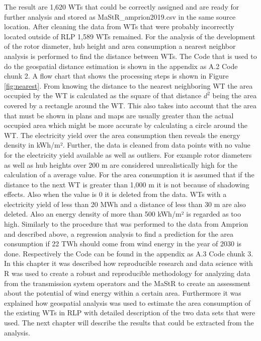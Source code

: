 \documentclass[a4paper,11pt]{article}
\begin{document}
The result are 1,620 WTs that could be correctly assigned and are ready for further analysis and stored as MaStR\_amprion2019.csv in the same source location. After cleaning the data from WTs that were probably incorrectly located outside of RLP 1,589 WTs remained. For the analysis of the development of the rotor diameter, hub height and area consumption a nearest neighbor analysis is performed to find the distance between WTs. The Code that is used to do the geospatial distance estimation is shown in the appendix as A.2 Code chunk 2. A flow chart that shows the processing steps is shown in Figure \ref{fig:nearest}. From knowing the distance to the nearest neighboring WT the area occupied by the WT is calculated as the square of that distance \(d^2\) being the area covered by a rectangle around the WT. This also takes into account that the area that must be shown in plans and maps are usually greater than the actual occupied area which might be more accurate by calculating a circle around the WT. The electricity yield over the area consumption then reveals the energy density in kWh/m². Further, the data is cleaned from data points with no value for the electricity yield available as well as outliers. For example rotor diameters as well as hub heights over 200 m are considered unrealistically high for the calculation of a average value. For the area consumption it is assumed that if the distance to the next WT is greater than 1,000 m it is not because of shadowing effects. Also when the value is 0 it is deleted from the data. WTs with a electricity yield of less than 20 MWh and a distance of less than 30 m are also deleted. Also an energy density of more than 500 kWh/m² is regarded as too high. Similarly to the procedure that was performed to the data from Amprion and described above, a regression analysis to find a prediction for the area consumption if 22 TWh should come from wind energy in the year of 2030 is done. Respectively the Code can be found in the appendix as A.3 Code chunk 3. In this chapter it was described how reproducible research and data science with R was used to create a robust and reproducible methodology for analyzing data from the transmission system operators and the MaStR to create an assessment about the potential of wind energy within a certain area. Furthermore it was explained how geospatial analysis was used to estimate the area consumption of the existing WTs in RLP with detailed description of the two data sets that were used. The next chapter will describe the results that could be extracted from the analysis.
\end{document}
